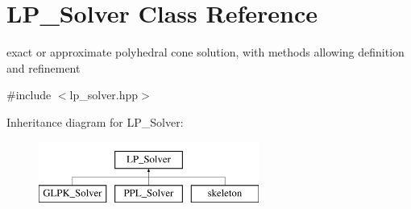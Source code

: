 \hypertarget{class_l_p___solver}{}\section{L\+P\+\_\+\+Solver Class Reference}
\label{class_l_p___solver}


exact or approximate polyhedral cone solution, with methods allowing definition and refinement  




{\ttfamily \#include $<$lp\+\_\+solver.\+hpp$>$}

Inheritance diagram for L\+P\+\_\+\+Solver\+:\begin{figure}[H]
\begin{center}
\leavevmode
\includegraphics[height=2.000000cm]{class_l_p___solver}
\end{center}
\end{figure}
